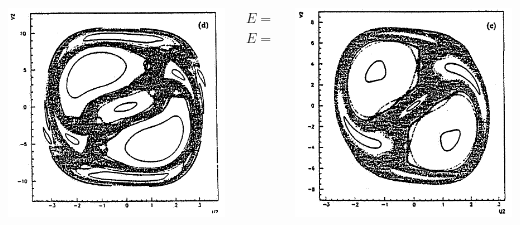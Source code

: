 \documentclass[a4,compress]{beamer}
\begin{document}
\begin{frame}
\begin{columns}[c]
\begin{column}{0.35\textwidth}
    \includegraphics[height=0.45\textheight]{ponicare-sections-e_240}
  \end{column}
  \begin{column}{0.15\textwidth}
    \small \centering \(E = 30\) \\
    \vspace{3cm}
    \(E = 240\)
  \end{column}
  \begin{column}{0.35\textwidth}
    \includegraphics[height=0.45\textheight]{ponicare-sections-e_120}


\end{column}
\end{columns}
\end{frame}
\end{document}
